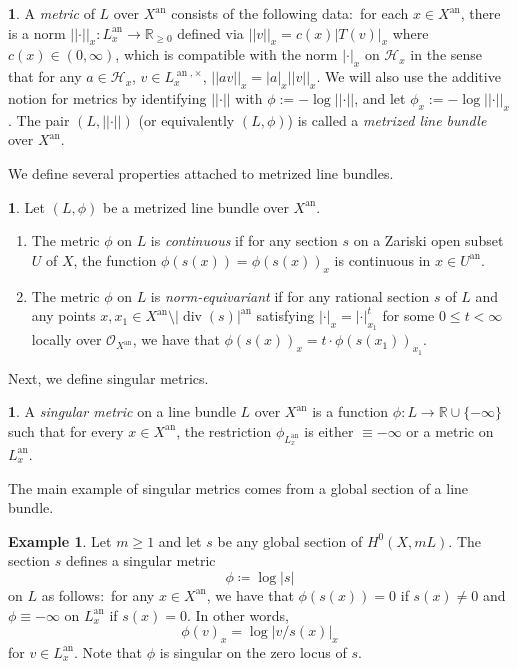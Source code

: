 \documentclass[11pt,reqno]{amsart}
\newcommand{\mR}{\mathbb{R}}
\newcommand{\cO}{\mathcal{O}}
\newcommand{\nrm}[1]{\left|\left |#1\right |\right |}
\newcommand{\sH}{{\mathscr H}}
\theoremstyle{theorem}
\numberwithin{equation}{subsection}
\numberwithin{equation}{subsection}
\theoremstyle{definition}
\newtheorem{definition}[subsubsection]{\text{Definition}}
\newtheorem{example}[subsubsection]{Example}
\theoremstyle{remark}
\numberwithin{equation}{subsubsection} \numberwithin{figure}{section}
\DeclareMathOperator{\an}{an}
\DeclareMathOperator{\ddiv}{div}
\newcommand{\cdef}[1]{\textsf{\textit{#1}}}
\renewcommand{\leq}{\leqslant}
\renewcommand{\geq}{\geqslant}
\begin{document}
\begin{definition}
A \cdef{metric} of $L$ over $X^{\an}$ consists of the following data:~for each $x\in X^{\an}$, there is a norm $\nrm{\cdot}_x\colon L^{\an}_x \to \mR_{\geq 0}$ defined via $\nrm{v}_x = c(x)|T(v)|_x$ where $c(x)\in (0,\infty)$, which is compatible with the norm $|\cdot|_x$ on $\sH_x$ in the sense that for any $a\in \sH_x$, $v\in L^{\an,\times}_x$, $\nrm{av}_x = |a|_{x}\nrm{v}_x$. 
We will also use the additive notion for metrics by identifying $\nrm{\cdot}$ with $\phi := -\log\nrm{\cdot}$, and let $\phi_x := -\log\nrm{\cdot}_x$. 
The pair $(L,\nrm{\cdot})$ (or equivalently $(L,\phi)$) is called a \cdef{metrized line bundle} over $X^{\an}$. 
\end{definition}


We define several properties attached to metrized line bundles. 

\begin{definition}
Let $(L,\phi)$ be a metrized line bundle over $X^{\an}$. 
\begin{enumerate}
\item The metric $\phi$ on $L$ is \cdef{continuous} if for any section $s$ on a Zariski open subset $U$ of $X$, the function $\phi(s(x)) = \phi(s(x))_x$ is continuous in $x\in U^{\an}$. 
\item The metric $\phi$ on $L$ is \cdef{norm-equivariant} if for any rational section $s$ of $L$ and any points $x, x_1 \in X^{\an}\setminus |\ddiv(s)|^{\an}$ satisfying $|\cdot|_x = |\cdot|_{x_1}^t$ for some $0\leq t < \infty$ locally over $\cO_{X^{\an}}$, we have that $\phi(s(x))_x = t\cdot \phi(s(x_1))_{x_1}$. 
\end{enumerate}
\end{definition}

Next, we define singular metrics.

\begin{definition}
A \cdef{singular metric} on a line bundle $L$ over $X^{\an}$ is a function $\phi\colon L \to \mR \cup \{-\infty\}$ such that for every $x\in X^{\an}$, the restriction $\phi_{L_x^{\an}}$ is either $\equiv -\infty$ or a metric on $L_x^{\an}$. 
\end{definition}

The main example of singular metrics comes from a global section of a line bundle. 

\begin{example}\label{example:sectionmetric}
Let $m\geq 1$ and let $s$ be any global section of $H^0(X,mL)$. 
The section $s$ defines a singular metric
\[
\phi \coloneqq \log |s|
\]
on $L$ as follows:~for any $x\in X^{\an}$, we have that $\phi(s(x)) = 0$ if $s(x)\neq 0$ and $\phi \equiv -\infty$ on $L_x^{\an}$ if $s(x) = 0$. 
In other words, 
\[
\phi(v)_x = \log |v/s(x)|_x
\]
for $v\in L_x^{\an}$. 
Note that $\phi$ is singular on the zero locus of $s$. 
\end{example}
\end{document}
